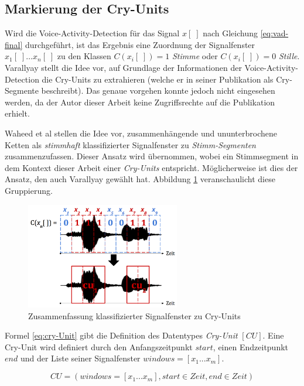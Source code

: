 \subsection{Markierung der Cry-Units}
\label{sec:CryUnit}

Wird die Voice-Activity-Detection für das Signal $x[\;]$ nach Gleichung \ref{eq:vad-final} durchgeführt, ist das Ergebnis eine Zuordnung der Signalfenster $x_1[\;] \ldots x_n[\;]$ zu den Klassen $C(x_i[\;]) = 1$ \emph{Stimme} oder  $C(x_i[\;]) = 0$ \emph{Stille}. Varallyay \cite[S. 16 - 17]{cry_thesis} stellt die Idee vor, auf Grundlage der Informationen der Voice-Activity-Detection die Cry-Units zu extrahieren (welche er in seiner Publikation als Cry-Segmente beschreibt). Das genaue vorgehen konnte jedoch nicht eingesehen werden, da der Autor dieser Arbeit keine Zugriffsrechte auf die Publikation erhielt.

Waheed et al \cite{vad_entropy} stellen die Idee vor, zusammenhängende und ununterbrochene Ketten als \emph{stimmhaft} klassifizierter Signalfenster zu \emph{Stimm-Segmenten} zusammenzufassen. Dieser Ansatz wird übernommen, wobei ein Stimmsegment in dem Kontext dieser Arbeit einer \emph{Cry-Units} entspricht. Möglicherweise ist dies der Ansatz, den auch  Varallyay \cite[S. 16 - 17]{cry_thesis} gewählt hat. Abbildung \ref{img:cryUnit} veranschaulicht diese Gruppierung. 

\begin{figure}[h]
	\centering
	\includegraphics[width=0.6\textwidth]{bilder/cry-Unit02.png}
	\caption{Zusammenfassung klassifizierter Signalfenster zu Cry-Units}
	\label{img:cryUnit}
\end{figure}

Formel \ref{eq:cry-Unit} gibt die Definition des Datentypes \emph{Cry-Unit} $[CU]$. Eine Cry-Unit wird definiert durch den Anfangszeitpunkt $start$, einen Endzeitpunkt $end$ und der Liste seiner Signalfenster $windows = [x_1 ... x_m]$.

\begin{equation}
CU = (windows = [x_1 ... x_m ], start \in Zeit, end \in Zeit)
\label{eq:cry-Unit}
\end{equation}

